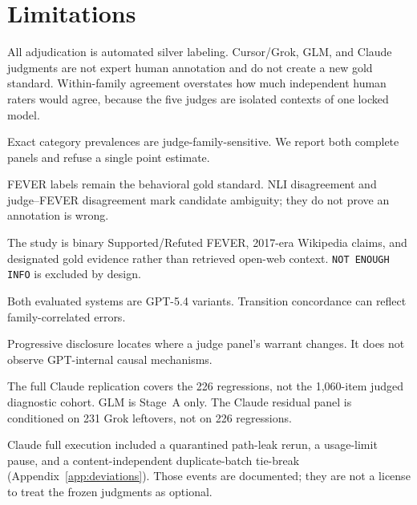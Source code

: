 \section{Limitations}
\label{sec:limitations}

All adjudication is automated silver labeling.
Cursor/Grok, GLM, and Claude judgments are not expert human annotation and do not create a new gold standard.
Within-family agreement overstates how much independent human raters would agree, because the five judges are isolated contexts of one locked model.

Exact category prevalences are judge-family-sensitive.
We report both complete panels and refuse a single point estimate.

FEVER labels remain the behavioral gold standard.
NLI disagreement and judge--FEVER disagreement mark candidate ambiguity; they do not prove an annotation is wrong.

The study is binary Supported/Refuted FEVER, 2017-era Wikipedia claims, and designated gold evidence rather than retrieved open-web context.
\texttt{NOT ENOUGH INFO} is excluded by design.

Both evaluated systems are GPT-5.4 variants.
Transition concordance can reflect family-correlated errors.

Progressive disclosure locates where a judge panel's warrant changes.
It does not observe GPT-internal causal mechanisms.

The full Claude replication covers the 226 regressions, not the 1{,}060-item judged diagnostic cohort.
GLM is Stage~A only.
The Claude residual panel is conditioned on 231 Grok leftovers, not on 226 regressions.

Claude full execution included a quarantined path-leak rerun, a usage-limit pause, and a content-independent duplicate-batch tie-break (Appendix~\ref{app:deviations}).
Those events are documented; they are not a license to treat the frozen judgments as optional.
